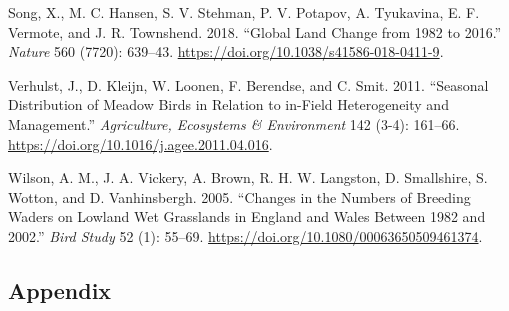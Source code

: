 \documentclass[
  12pt,
  letterpaper,
  DIV=11,
  numbers=noendperiod]{scrartcl}
\newlength{\cslhangindent}
\newenvironment{CSLReferences}[2] %
 {\begin{list}{}{%
  \setlength{\itemindent}{0pt}
  \setlength{\leftmargin}{0pt}
  \setlength{\parsep}{0pt}
  \ifodd #1
   \setlength{\leftmargin}{\cslhangindent}
   \setlength{\itemindent}{-1\cslhangindent}
  \fi
  \setlength{\itemsep}{#2\baselineskip}}}
 {\end{list}}
\begin{document}
\begin{CSLReferences}{1}{0}
Song, X., M. C. Hansen, S. V. Stehman, P. V. Potapov, A. Tyukavina, E.
F. Vermote, and J. R. Townshend. 2018. {``Global Land Change from 1982
to 2016.''} \emph{Nature} 560 (7720): 639--43.
\url{https://doi.org/10.1038/s41586-018-0411-9}.

Verhulst, J., D. Kleijn, W. Loonen, F. Berendse, and C. Smit. 2011.
{``Seasonal Distribution of Meadow Birds in Relation to in-Field
Heterogeneity and Management.''} \emph{Agriculture, Ecosystems \&
Environment} 142 (3-4): 161--66.
\url{https://doi.org/10.1016/j.agee.2011.04.016}.

Wilson, A. M., J. A. Vickery, A. Brown, R. H. W. Langston, D.
Smallshire, S. Wotton, and D. Vanhinsbergh. 2005. {``Changes in the
Numbers of Breeding Waders on Lowland Wet Grasslands in England and
Wales Between 1982 and 2002.''} \emph{Bird Study} 52 (1): 55--69.
\url{https://doi.org/10.1080/00063650509461374}.

\end{CSLReferences}

\newpage{}

\subsection{Appendix}\label{appendix}

\beginsupplement

\begingroup\fontsize{7}{9}\selectfont
\end{document}
